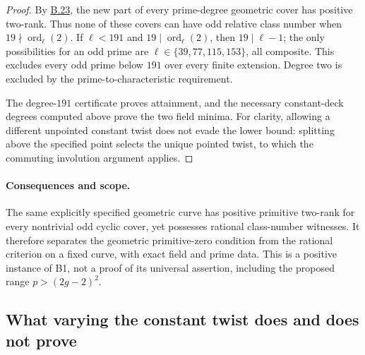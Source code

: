 \documentclass[11pt,a4paper]{article}
\newcommand{\statementref}[1]{\hyperlink{#1}{#1}}
\begin{document}
\begin{proof}
By \statementref{B.23}, the new part of every prime-degree
geometric cover has positive two-rank. Thus none of these
covers can have odd relative class number when
$19\nmid\operatorname{ord}_\ell(2)$. If $\ell<191$ and
$19\mid\operatorname{ord}_\ell(2)$, then $19\mid\ell-1$;
the only possibilities for an odd prime are
$\ell\in\{39,77,115,153\}$, all composite. This excludes every
odd prime below $191$ over every finite extension. Degree two
is excluded by the prime-to-characteristic requirement.

The degree-$191$ certificate proves attainment, and the necessary
constant-deck degrees computed above prove the two field minima.
For clarity, allowing a different unpointed constant twist does
not evade the lower bound: splitting above the specified point
selects the unique pointed twist, to which the commuting
involution argument applies.
\end{proof}

\paragraph{Consequences and scope.}
The same explicitly specified geometric curve has positive primitive
two-rank for every nontrivial odd cyclic cover, yet possesses rational
class-number witnesses. It therefore separates the geometric
primitive-zero condition from the rational criterion on a fixed
curve, with exact field and prime data. This is a positive instance
of B1, not a proof of its universal assertion, including the proposed
range $p>(2g-2)^2$.


\subsection{What varying the constant twist does and does not prove}
\end{document}
